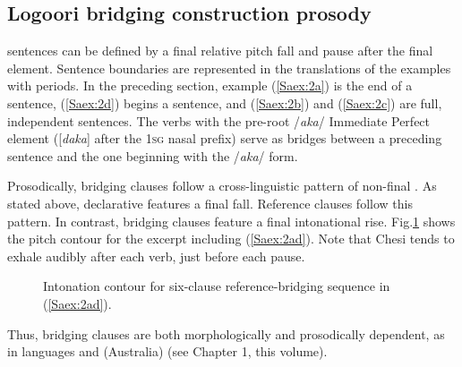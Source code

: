 \documentclass[output=paper]{LSP/langsci}
\begin{document}
\subsection{Logoori bridging construction prosody}
\label{Saprosody}
  sentences can be defined by a final relative pitch fall and pause after the final element. Sentence boundaries are represented in the translations of the examples with periods. In the preceding section, example (\ref{Saex:2a}) is the end of a  sentence, (\ref{Saex:2d}) begins a  sentence, and (\ref{Saex:2b}) and (\ref{Saex:2c}) are full, independent  sentences. The verbs with the pre-root /\textit{aka}/ Immediate Perfect element ([\textit{daka}] after the \textsc{1sg} nasal prefix) serve as bridges between a preceding  sentence and the one beginning with the /\textit{aka}/ form. 

Prosodically,  bridging clauses follow a cross-linguistic pattern of non-final  \citep{devries.2005}. As stated above,  declarative  features a final fall. Reference clauses follow this pattern. In contrast, bridging clauses feature a final intonational rise. Fig.\ref{SaFig1} shows the pitch contour for the excerpt including (\ref{Saex:2ad}). Note that Chesi tends to exhale audibly after each verb, just before each pause.
%


\begin{figure}[ht]
\caption{Intonation contour for six-clause reference-bridging sequence in (\ref{Saex:2ad}). \label{SaFig1}}
\end{figure}

Thus,  bridging clauses are both morphologically  and prosodically dependent, as in  languages and  (Australia) (see Chapter 1, this volume).
\end{document}
